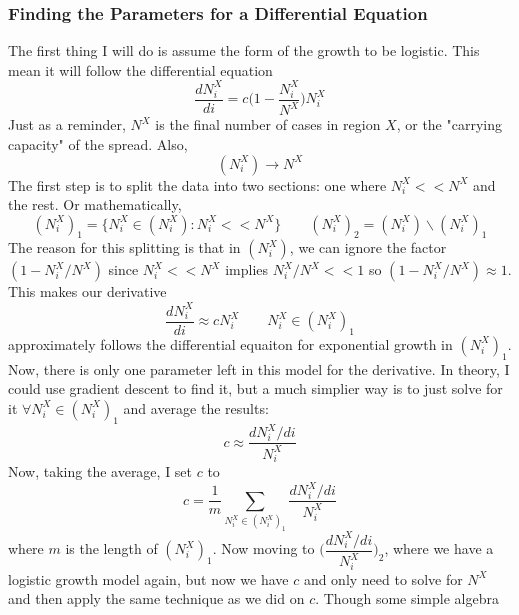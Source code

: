 \documentclass{report}
\begin{document}
            \subsubsection{Finding the Parameters for a Differential Equation}
                The first thing I will do is assume the form of the growth to be logistic. This mean it will follow the differential equation
                \begin{equation}
                    \dfrac{dN^X_i}{di} = c\big(1 - \dfrac{N^X_i}{N^X}\big)N^X_i
                \end{equation}
                Just as a reminder, $N^X$ is the final number of cases in region $X$, or the "carrying capacity" of the spread. Also,
                $$(N^X_i) \rightarrow N^X$$
                \indent
                The first step is to split the data into two sections: one where $N^X_i << N^X$ and the rest. Or mathematically,
                \begin{equation}
                    (N^X_i)_1 = \{N^X_i \in (N^X_i): N^X_i << N^X\} \qquad (N^X_i)_2 = (N^X_i) \backslash (N^X_i)_1
                \end{equation}
                The reason for this splitting is that in $(N^X_i)$, we can ignore the factor $(1 - N^X_i/N^X)$ since $N^X_i << N^X$ implies $N^X_i / N^X << 1$ so $(1 - N^X_i/N^X) \approx 1$. This makes our derivative 
                $$\dfrac{dN^X_i}{di} \approx cN^X_i \qquad N^X_i \in (N^X_i)_1$$
                approximately follows the differential equaiton for exponential growth in $(N^X_i)_1$. Now, there is only one parameter left in this model for the derivative. In theory, I could use gradient descent to find it, but a much simplier way is to just solve for it $\forall N^X_i \in (N^X_i)_1$ and average the results:
                $$c \approx \dfrac{dN^X_i/di}{N^X_i}$$
                Now, taking the average, I set $c$ to 
                \begin{equation}
                    c = \dfrac{1}{m}\sum_{N^X_i \in (N^X_i)_1}\dfrac{dN^X_i/di}{N^X_i}
                \end{equation}
                where $m$ is the length of $(N^X_i)_1$.
                \newline\indent
                Now moving to $\big(\dfrac{dN^X_i/di}{N^X_i}\big)_2$, where we have a logistic growth model again, but now we have $c$ and only need to solve for $N^X$ and then apply the same technique as we did on $c$.
                \newline\indent
                Though some simple algebra
\end{document}
